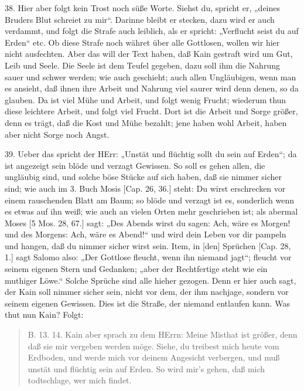 38. Hier aber folgt kein Trost noch süße Worte. Siehst du, spricht er, „deines Bruders Blut schreiet zu mir“. Darinne bleibt er stecken, dazu wird er auch verdammt, und folgt die Strafe auch leiblich, als er spricht: „Verflucht seist du auf Erden“ etc. Ob diese Strafe noch währet über alle Gottlosen, wollen wir hier nicht ausfechten. Aber das will der Text haben, daß Kain gestraft wird um Gut, Leib und Seele. Die Seele ist dem Teufel gegeben, dazu soll ihm die Nahrung sauer und schwer werden; wie auch
geschieht; auch allen Ungläubigen, wenn man es ansieht, daß ihnen ihre Arbeit und Nahrung viel saurer wird denn denen, so da glauben. Da ist viel Mühe und Arbeit, und folgt wenig Frucht; wiederum thun diese leichtere Arbeit, und folgt viel Frucht. Dort ist die Arbeit und Sorge größer, denn es trägt, daß die Kost und Mühe bezahlt; jene haben wohl Arbeit, haben aber nicht Sorge noch Angst.

39. Ueber das spricht der HErr: „Unstät und flüchtig sollt du sein auf Erden“; da ist angezeigt sein blöde und verzagt Gewissen. So soll es gehen allen, die ungläubig sind, und solche böse Stücke auf sich haben, daß sie nimmer sicher sind; wie auch im 3. Buch Mosis [Cap. 26, 36.] steht: Du wirst erschrecken vor einem rauschenden Blatt am Baum; so blöde und verzagt ist es, sonderlich wenn es etwas auf ihn weiß; wie auch an vielen Orten mehr geschrieben ist; als abermal Moses [5 Mos. 28, 67.] sagt: „Des Abends wirst du sagen: Ach, wäre es Morgen! und des Morgens: Ach, wäre es Abend!“ und wird dein Leben vor dir pampeln und hangen, daß du nimmer sicher wirst sein. Item, in [den] Sprüchen [Cap. 28, 1.] sagt Salomo also: „Der Gottlose fleucht, wenn ihn niemand jagt“; fleucht vor seinem eigenen Stern und Gedanken; „aber der Rechtfertige steht wie ein muthiger Löwe.“ Solche Sprüche sind alle hieher gezogen. Denn er hier auch sagt, der Kain soll nimmer sicher sein, nicht vor dem, der ihm nachjage, sondern vor seinem eigenen Gewissen. Dies ist die Straße, der niemand entlaufen kann. Was thut nun Kain? Folgt:

\begin{quote}
B. 13. 14. Kain aber sprach zu dem HErrn: Meine Misthat ist größer, denn daß sie mir vergeben werden möge. Siehe, du treibest mich heute vom Erdboden, und werde mich vor deinem Angesicht verbergen, und muß unstät und flüchtig sein auf Erden. So wird mir’s gehen, daß mich todtschlage, wer mich findet.
\end{quote}

